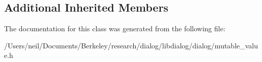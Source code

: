 \subsection*{Additional Inherited Members}


The documentation for this class was generated from the following file\+:\begin{DoxyCompactItemize}
\item 
/\+Users/neil/\+Documents/\+Berkeley/research/dialog/libdialog/dialog/mutable\+\_\+value.\+h\end{DoxyCompactItemize}
